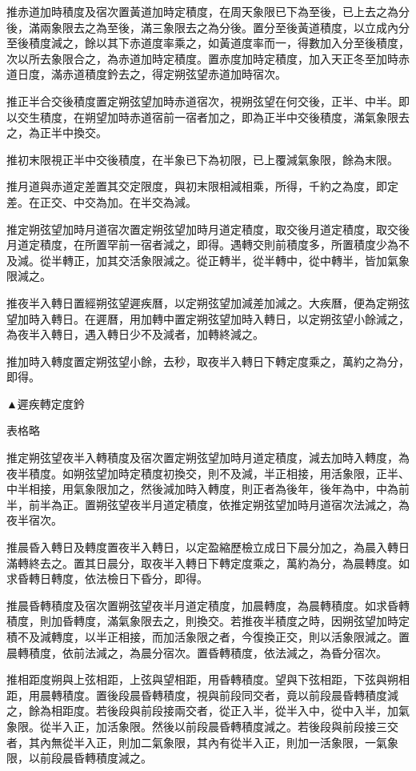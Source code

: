 推赤道加時積度及宿次置黃道加時定積度，在周天象限已下為至後，已上去之為分後，滿兩象限去之為至後，滿三象限去之為分後。置分至後黃道積度，以立成內分至後積度減之，餘以其下赤道度率乘之，如黃道度率而一，得數加入分至後積度，次以所去象限合之，為赤道加時定積度。置赤度加時定積度，加入天正冬至加時赤道日度，滿赤道積度鈐去之，得定朔弦望赤道加時宿次。

推正半合交後積度置定朔弦望加時赤道宿次，視朔弦望在何交後，正半、中半。即以交生積度，在朔望加時赤道宿前一宿者加之，即為正半中交後積度，滿氣象限去之，為正半中換交。

推初末限視正半中交後積度，在半象已下為初限，已上覆減氣象限，餘為末限。

推月道與赤道定差置其交定限度，與初末限相減相乘，所得，千約之為度，即定差。在正交、中交為加。在半交為減。

推定朔弦望加時月道宿次置定朔弦望加時月道定積度，取交後月道定積度，取交後月道定積度，在所置罕前一宿者減之，即得。遇轉交則前積度多，所置積度少為不及減。從半轉正，加其交活象限減之。從正轉半，從半轉中，從中轉半，皆加氣象限減之。

推夜半入轉日置經朔弦望遲疾曆，以定朔弦望加減差加減之。大疾曆，便為定朔弦望加時入轉日。在遲曆，用加轉中置定朔弦望加時入轉日，以定朔弦望小餘減之，為夜半入轉日，遇入轉日少不及減者，加轉終減之。

推加時入轉度置定朔弦望小餘，去秒，取夜半入轉日下轉定度乘之，萬約之為分，即得。

▲遲疾轉定度鈐

表格略

推定朔弦望夜半入轉積度及宿次置定朔弦望加時月道定積度，減去加時入轉度，為夜半積度。如朔弦望加時定積度初換交，則不及減，半正相接，用活象限，正半、中半相接，用氣象限加之，然後減加時入轉度，則正者為後年，後年為中，中為前半，前半為正。置朔弦望夜半月道定積度，依推定朔弦望加時月道宿次法減之，為夜半宿次。

推晨昏入轉日及轉度置夜半入轉日，以定盈縮歷檢立成日下晨分加之，為晨入轉日滿轉終去之。置其日晨分，取夜半入轉日下轉定度乘之，萬約為分，為晨轉度。如求昏轉日轉度，依法檢日下昏分，即得。

推晨昏轉積度及宿次置朔弦望夜半月道定積度，加晨轉度，為晨轉積度。如求昏轉積度，則加昏轉度，滿氣象限去之，則換交。若推夜半積度之時，因朔弦望加時定積不及減轉度，以半正相接，而加活象限之者，今復換正交，則以活象限減之。置晨轉積度，依前法減之，為晨分宿次。置昏轉積度，依法減之，為昏分宿次。

推相距度朔與上弦相距，上弦與望相距，用昏轉積度。望與下弦相距，下弦與朔相距，用晨轉積度。置後段晨昏轉積度，視與前段同交者，竟以前段晨昏轉積度減之，餘為相距度。若後段與前段接兩交者，從正入半，從半入中，從中入半，加氣象限。從半入正，加活象限。然後以前段晨昏轉積度減之。若後段與前段接三交者，其內無從半入正，則加二氣象限，其內有從半入正，則加一活象限，一氣象限，以前段晨昏轉積度減之。

